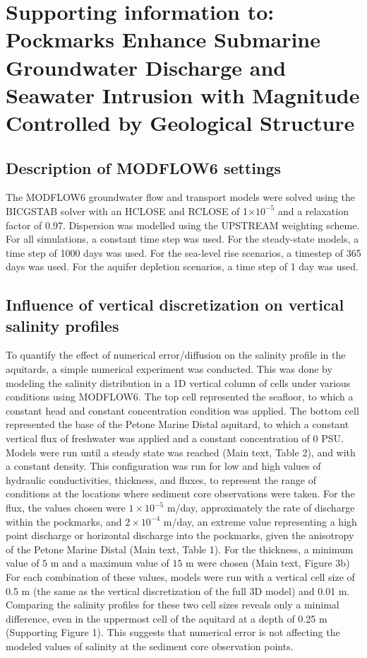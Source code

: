 \documentclass{article}
\begin{document}
\section{Supporting information to: Pockmarks Enhance Submarine Groundwater Discharge and Seawater Intrusion with Magnitude Controlled by Geological Structure}

\subsection{Description of MODFLOW6 settings}
The MODFLOW6 groundwater flow and transport models were solved using the BICGSTAB solver with an HCLOSE and RCLOSE of 1$\times10^{-5}$ and a relaxation factor of 0.97.
Dispersion was modelled using the UPSTREAM weighting scheme. For all simulations, a constant time step was used. For the steady-state models, a time step of 1000 days was used.
For the sea-level rise scenarios, a timestep of 365 days was used. For the aquifer depletion scenarios, a time step of 1 day was used.

\subsection{Influence of vertical discretization on vertical salinity profiles}

To quantify the effect of numerical error/diffusion on the salinity profile in the aquitards, a simple numerical experiment was conducted. 
This was done by modeling the salinity distribution in a 1D vertical column of cells under various conditions using MODFLOW6.
The top cell represented the seafloor, to which a constant head and constant concentration condition was applied. 
The bottom cell represented the base of the Petone Marine Distal aquitard, to which a constant vertical flux of freshwater was applied and a constant concentration of 0 PSU. 
Models were run until a steady state was reached (Main text, Table 2), and with a constant density.
This configuration was run for low and high values of hydraulic conductivities, thickness, and fluxes, to represent the range of conditions at the locations where sediment core observations were taken. 
For the flux, the values chosen were $1\times10^{-5}$ m/day, approximately the rate of discharge within the pockmarks, and $2\times10^{-4}$ m/day, an extreme value representing a high point discharge or horizontal discharge into the pockmarks, given the anisotropy of the Petone Marine Distal (Main text, Table 1).
For the thickness, a minimum value of $5$ m and a maximum value of $15$ m were chosen (Main text, Figure 3b)
For each combination of these values, models were run with a vertical cell size of 0.5 m (the same as the vertical discretization of the full 3D model) and 0.01 m.
Comparing the salinity profiles for these two cell sizes reveals only a minimal difference, even in the uppermost cell of the aquitard at a depth of 0.25 m (Supporting Figure 1). This suggests that numerical error is not affecting the modeled values of salinity at the sediment core observation points.
\end{document}
